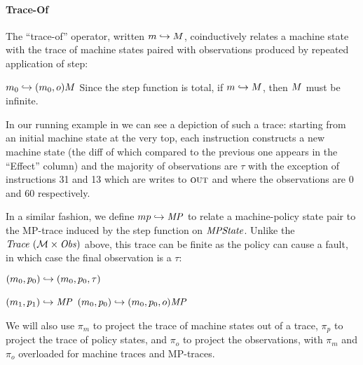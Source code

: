 \documentclass[acmsmall,review,anonymous]{acmart}\settopmatter{printfolios=true,printccs=false,printacmref=false}
\begin{document}

\paragraph*{Trace-Of}

The ``trace-of'' operator, written \(m \hookrightarrow M\),
coinductively relates a machine state with the trace of machine states
paired with observations produced by repeated application of step:

            {\(m_0 \hookrightarrow (m_0,o) M\)}%
%
\noindent
Since the step function is total, if \(m \hookrightarrow M\),
then \(M\) must be infinite.

In our running example in  we can
see a depiction of such a trace: starting from an initial machine
state at the very top, each instruction constructs a new machine state
(the diff of which compared to the previous one appears in the
``Effect'' column) and the majority of observations are $\tau$ with
the exception of instructions 31 and 13 which are writes to $\textsc{out}$
and where the observations are $0$ and $60$ respectively.

In a similar fashion, we define \(mp \hookrightarrow \mathit{MP}\)
to relate a machine-policy state pair to the MP-trace
induced by the step function on $\mathit{MPState}$. Unlike the $\mathit{Trace}~({\mathcal M} \times \mathit{Obs})$ above, this trace can
be finite as the policy can cause a fault, in which case the final observation is
a \(\tau\):

\begin{minipage}{.4\textwidth}
         {\((m_0,p_0) \hookrightarrow (m_0,p_0,\tau)\)}
\end{minipage}
\begin{minipage}{.55\textwidth}
              {\((m_1,p_1) \hookrightarrow \mathit{MP}\)}
              {\((m_0,p_0) \hookrightarrow
                 (m_0,p_0,o) \mathit{MP}\)}
\end{minipage}

We will also use \(\pi_m\) to project the trace of machine states
out of a trace, \(\pi_p\) to project the trace of policy states, and
\(\pi_o\) to project the observations, with \(\pi_m\) and \(\pi_o\) overloaded
for machine traces and MP-traces.
\end{document}
